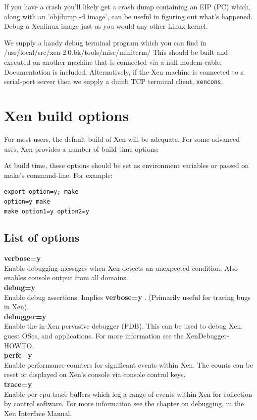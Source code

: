 \documentclass[11pt,twoside,final,openright]{xenstyle}
\begin{document}
{If you have a crash you'll likely get a crash dump containing an EIP
(PC) which, along with an 'objdump -d image', can be useful in
figuring out what's happened.  Debug a Xenlinux image just as you
would any other Linux kernel.

We supply a handy debug terminal program which you can find in
/usr/local/src/xen-2.0.bk/tools/misc/miniterm/
This should be built and executed on another machine that is connected
via a null modem cable. Documentation is included.
Alternatively, if the Xen machine is connected to a serial-port server
then we supply a dumb TCP terminal client, {\tt xencons}.

\chapter{Xen build options}

For most users, the default build of Xen will be adequate.  For some
advanced uses, Xen provides a number of build-time options:

At build time, these options should be set as environment variables or
passed on make's command-line.  For example:

\begin{verbatim}
export option=y; make
option=y make
make option1=y option2=y
\end{verbatim}

\section{List of options}

{\bf verbose=y }\\
Enable debugging messages when Xen detects an unexpected condition.
Also enables console output from all domains. \\
{\bf debug=y }\\
Enable debug assertions.  Implies {\bf verbose=y }.
(Primarily useful for tracing bugs in Xen).        \\
{\bf debugger=y }\\
Enable the in-Xen pervasive debugger (PDB).
This can be used to debug Xen, guest OSes, and
applications. For more information see the 
XenDebugger-HOWTO.                                 \\
{\bf perfc=y }\\
Enable performance-counters for significant events
within Xen. The counts can be reset or displayed
on Xen's console via console control keys.          \\
{\bf trace=y }\\
Enable per-cpu trace buffers which log a range of
events within Xen for collection by control
software.  For more information see the chapter on debugging,
in the Xen Interface Manual.

}
\end{document}
